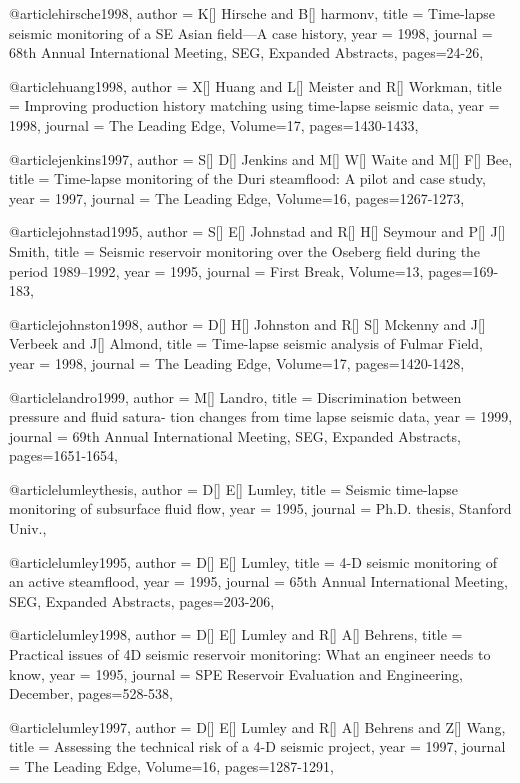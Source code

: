 @article{hirsche1998,
  author =	 {K[] Hirsche and B[] harmonv},
  title =	 {Time-lapse seismic monitoring of a SE Asian field—A case history},
  year =	 1998,
  journal =	 {68th Annual International Meeting, SEG, Expanded Abstracts},
 pages=24-26,
}

@article{huang1998,
  author =	 {X[] Huang and L[] Meister and R[] Workman},
  title =	 {Improving production history matching using time-lapse seismic data},
  year =	 1998,
  journal =	 {The Leading Edge},
    Volume=17,
 pages=1430-1433,
}

@article{jenkins1997,
  author =	 {S[] D[] Jenkins and M[] W[] Waite and M[] F[] Bee},
  title =	 {Time-lapse monitoring of the Duri steamflood: A pilot and case study},
  year =	 1997,
  journal =	 {The Leading Edge},
    Volume=16,
 pages=1267-1273,
}


@article{johnstad1995,
  author =	 {S[] E[] Johnstad and R[] H[] Seymour and P[] J[] Smith},
  title =	 { Seismic reservoir monitoring over the Oseberg field during the period 1989–1992},
  year =	 1995,
  journal =	 {First Break},
    Volume=13,
 pages=169-183,
}


@article{johnston1998,
  author =	 {D[] H[] Johnston and R[] S[] Mckenny and J[] Verbeek and J[] Almond},
  title =	 {Time-lapse seismic analysis of Fulmar Field},
  year =	 1998,
  journal =	 {The Leading Edge},
    Volume=17,
 pages=1420-1428,
}

@article{landro1999,
  author =	 {M[] Landro},
  title =	 {Discrimination between pressure and fluid satura-
tion changes from time lapse seismic data},
  year =	 1999,
  journal =	 {69th Annual International Meeting, SEG, Expanded Abstracts},
 pages=1651-1654,
}

@article{lumleythesis,
  author =	 {D[] E[] Lumley},
  title =	 {Seismic time-lapse monitoring of subsurface fluid
flow},
  year =	 1995,
  journal =	 {Ph.D. thesis, Stanford Univ.},
}

@article{lumley1995,
  author =	 {D[] E[] Lumley},
  title =	 { 4-D seismic monitoring of an active steamflood},
  year =	 1995,
  journal =	 {65th Annual International Meeting, SEG, Expanded Abstracts},
 pages=203-206,
}

@article{lumley1998,
  author =	 {D[] E[] Lumley and R[] A[] Behrens},
  title =	 { Practical issues of 4D seismic reservoir monitoring: What an engineer needs to know},
  year =	 1995,
  journal =	 {SPE Reservoir Evaluation and Engineering, December},
 pages=528-538,
}

@article{lumley1997,
  author =	 {D[] E[] Lumley and R[] A[] Behrens and Z[] Wang},
  title =	 {Assessing the technical risk of a 4-D seismic project},
  year =	 1997,
  journal =	 {The Leading Edge},
    Volume=16,
 pages=1287-1291,
}

